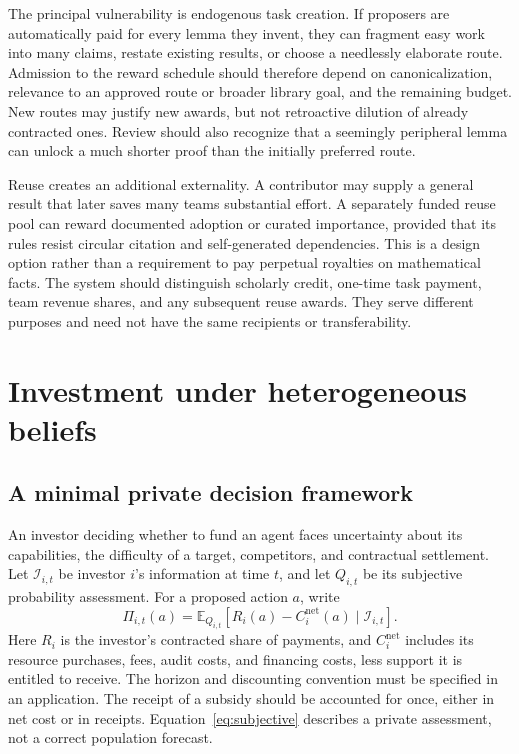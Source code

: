 \documentclass[11pt,a4paper]{article}
\newcommand{\E}{\mathbb{E}}
\begin{document}
The principal vulnerability is endogenous task creation. If proposers are automatically paid for every lemma they invent, they can fragment easy work into many claims, restate existing results, or choose a needlessly elaborate route. Admission to the reward schedule should therefore depend on canonicalization, relevance to an approved route or broader library goal, and the remaining budget. New routes may justify new awards, but not retroactive dilution of already contracted ones. Review should also recognize that a seemingly peripheral lemma can unlock a much shorter proof than the initially preferred route.

Reuse creates an additional externality. A contributor may supply a general result that later saves many teams substantial effort. A separately funded reuse pool can reward documented adoption or curated importance, provided that its rules resist circular citation and self-generated dependencies. This is a design option rather than a requirement to pay perpetual royalties on mathematical facts. The system should distinguish scholarly credit, one-time task payment, team revenue shares, and any subsequent reuse awards. They serve different purposes and need not have the same recipients or transferability.

\section{Investment under heterogeneous beliefs}
\label{sec:investment}
\subsection{A minimal private decision framework}
An investor deciding whether to fund an agent faces uncertainty about its capabilities, the difficulty of a target, competitors, and contractual settlement. Let $\mathcal I_{i,t}$ be investor $i$'s information at time $t$, and let $Q_{i,t}$ be its subjective probability assessment. For a proposed action $a$, write
\begin{equation}
 \Pi_{i,t}(a)=\E_{Q_{i,t}}\!\left[
 R_i(a)-C_i^{\mathrm{net}}(a)\mid\mathcal I_{i,t}\right].
 \label{eq:subjective}
\end{equation}
Here $R_i$ is the investor's contracted share of payments, and $C_i^{\mathrm{net}}$ includes its resource purchases, fees, audit costs, and financing costs, less support it is entitled to receive. The horizon and discounting convention must be specified in an application. The receipt of a subsidy should be accounted for once, either in net cost or in receipts. Equation~\eqref{eq:subjective} describes a private assessment, not a correct population forecast.
\end{document}
